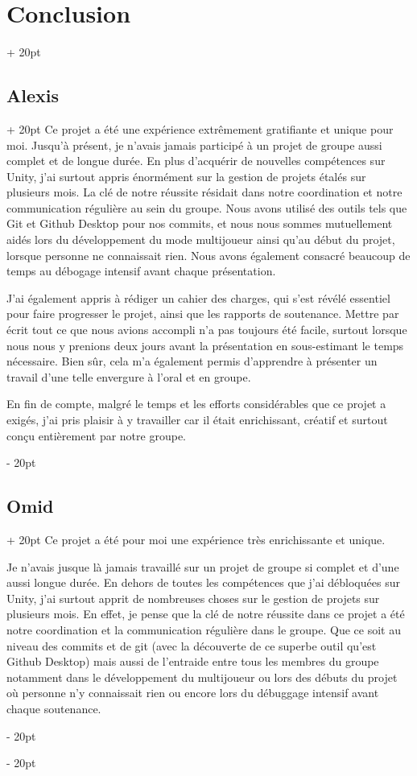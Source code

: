 \documentclass[a4paper, 12pt, twoside]{article}
\newcommand{\ind}[1][20pt]{\advance\leftskip + #1}
\newcommand{\deind}[1][20pt]{\advance\leftskip - #1}
\newenvironment{indt}[2][20pt]{#2 \par \ind[#1]}{\par \deind} %
\begin{document}
\begin{indt}{\section{Conclusion}}
        \begin{indt}{\subsection{Alexis}}
            Ce projet a été une expérience extrêmement gratifiante et unique pour moi. Jusqu'à présent, je n'avais jamais participé à un projet de groupe aussi complet et de longue durée. En plus d'acquérir de nouvelles compétences sur Unity, j'ai surtout appris énormément sur la gestion de projets étalés sur plusieurs mois. La clé de notre réussite résidait dans notre coordination et notre communication régulière au sein du groupe. Nous avons utilisé des outils tels que Git et Github Desktop pour nos commits, et nous nous sommes mutuellement aidés lors du développement du mode multijoueur ainsi qu'au début du projet, lorsque personne ne connaissait rien. Nous avons également consacré beaucoup de temps au débogage intensif avant chaque présentation.

            J'ai également appris à rédiger un cahier des charges, qui s'est révélé essentiel pour faire progresser le projet, ainsi que les rapports de soutenance. Mettre par écrit tout ce que nous avions accompli n'a pas toujours été facile, surtout lorsque nous nous y prenions deux jours avant la présentation en sous-estimant le temps nécessaire. Bien sûr, cela m'a également permis d'apprendre à présenter un travail d'une telle envergure à l'oral et en groupe.

            En fin de compte, malgré le temps et les efforts considérables que ce projet a exigés, j'ai pris plaisir à y travailler car il était enrichissant, créatif et surtout conçu entièrement par notre groupe.
        \end{indt}

        \newpage

        \begin{indt}{\subsection{Omid}}
            Ce projet a été pour moi une expérience très enrichissante et unique.

            Je n’avais jusque là jamais travaillé sur un projet de groupe si complet et d’une aussi longue durée. En dehors de toutes les compétences que j’ai débloquées sur Unity, j’ai surtout apprit de nombreuses choses sur le gestion de projets sur plusieurs mois. En effet, je pense que la clé de notre réussite dans ce projet a été notre coordination et la communication régulière dans le groupe. Que ce soit au niveau des commits et de git (avec la découverte de ce superbe outil qu’est Github Desktop) mais aussi de l’entraide entre tous les membres du groupe notamment dans le développement du multijoueur ou lors des débuts du projet où personne n’y connaissait rien ou encore lors du débuggage intensif avant chaque soutenance.


\end{indt}
\end{indt}
\end{document}
